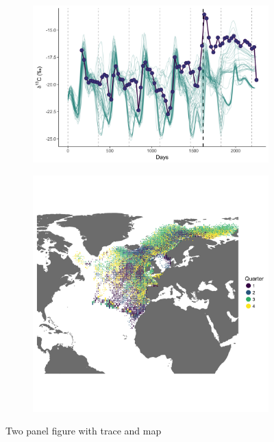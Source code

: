 \documentclass[a4paper,12pt]{article}
\begin{document}
\begin{figure}
  \centering
    \begin{subfigure}[b]{0.45\textwidth}
      \centering
      \includegraphics[width = \linewidth]{figures/Figure-1c-migratory-model-d13C.png}
      \label{fig3a}
    \end{subfigure}
    \begin{subfigure}[b]{0.45\textwidth}
      \centering
      \includegraphics[width = \linewidth]{figures/Figure-1b-migratory-model-full-map.png}
      \label{fig3b}
    \end{subfigure} 
  \caption{Two panel figure with trace and map}
\end{figure}
\end{document}
